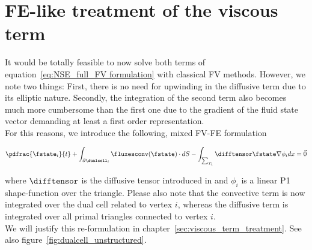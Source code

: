 \documentclass[../main.tex]{subfiles}
\begin{document}
\section{\ac{FE}-like treatment of the viscous term}\label{sec:mixed_FV_FE_formulation}
It would be totally feasible to now solve both terms of equation~\ref{eq:NSE_full_FV formulation} with classical \ac{FV} methods. However, we note two things: First, there is no need for upwinding in the diffusive term due to its elliptic nature.
Secondly, the integration of the second term also becomes much more cumbersome than the first one due to the gradient of the fluid state vector demanding at least a first order representation.\\
For this reasons, we introduce the following, mixed \ac{FV}-\ac{FE} formulation

\begin{align}\label{eq_mixed_FV_FE}
\pdfrac{\fstate_i}{t} +
\int_{\partial\dualcell_i} \fluxesconv(\fstate)\cdot dS -
\int_{\sum_{T_i}} \difftensor \fstate \nabla \phi_i dx =
\vec{0}
\end{align}

where $\difftensor$ is the diffusive tensor introduced in \cite{Larat2012} and $\phi_i$ is a linear P1 shape-function over the triangle.
Please also note that the convective term is now integrated over the dual cell related to vertex $i$, whereas the diffusive term is integrated over all primal triangles connected to vertex $i$.\\
We will justify this re-formulation in chapter~\ref{sec:viscous_term_treatment}. See also figure~\ref{fig:dualcell_unstructured}.
\end{document}
